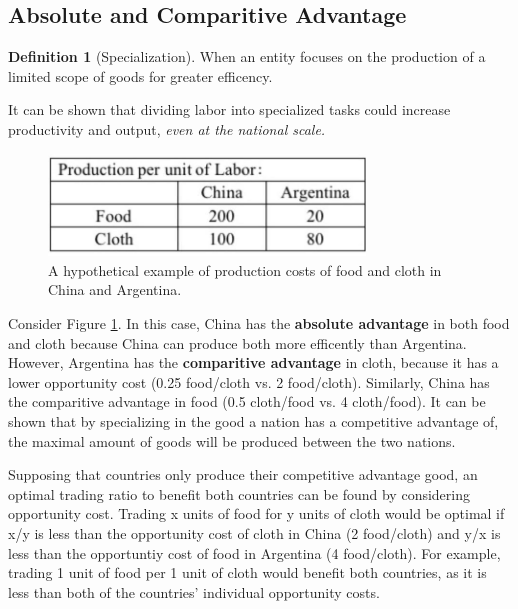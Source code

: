 \documentclass[12pt, a4paper]{article}
\theoremstyle{definition}
\newtheorem{definition}{Definition}
\begin{document}
\subsection{Absolute and Comparitive Advantage}
\begin{definition}[Specialization]
    When an entity focuses on the production of a limited scope of goods for greater efficency.
\end{definition}

It can be shown that dividing labor into specialized tasks could increase productivity and output, \textit{even at the national scale.}

\begin{figure}[ht] %
    \centering
    \includegraphics[width=0.75\textwidth]{advantage.jpg}
    \caption{A hypothetical example of production costs of food and cloth in China and Argentina.}
    \label{fig:advantage}
\end{figure}

Consider Figure \ref{fig:advantage}. 
In this case, China has the \textbf{absolute advantage} in both food and cloth because China can produce both more efficently than Argentina.
However, Argentina has the \textbf{comparitive advantage} in cloth, because it has a lower opportunity cost (0.25 food/cloth vs. 2 food/cloth).
Similarly, China has the comparitive advantage in food (0.5 cloth/food vs. 4 cloth/food).
It can be shown that by specializing in the good a nation has a competitive advantage of, the maximal amount of goods will be produced between the two nations.

Supposing that countries only produce their competitive advantage good, an optimal trading ratio to benefit both countries can be found by considering opportunity cost.
Trading x units of food for y units of cloth would be optimal if x/y is less than the opportunity cost of cloth in China (2 food/cloth) and y/x is less than the opportuntiy cost of food in Argentina (4 food/cloth).
For example, trading 1 unit of food per 1 unit of cloth would benefit both countries, as it is less than both of the countries' individual opportunity costs.

\newpage
\end{document}
